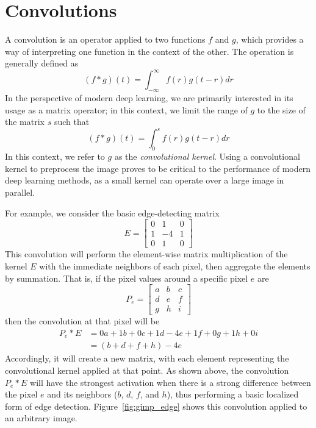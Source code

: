 \section{Convolutions}
A convolution is an operator applied to two functions $f$ and $g$, which provides a way of interpreting one function in the context of the other.
The operation is generally defined as
\[(f * g)(t) = \int_{-\infty}^\infty f(r)g(t-r) dr\]
In the perspective of modern deep learning, we are primarily interested in its usage as a matrix operator; in this context, we limit the range of $g$ to the size of the matrix $s$ such that
\[(f * g)(t) = \int_0^s f(r)g(t-r) dr\]
In this context, we refer to $g$ as the \emph{convolutional kernel}.
Using a convolutional kernel to preprocess the image proves to be critical to the performance of modern deep learning methods, as a small kernel can operate over a large image in parallel.

For example, we consider the basic edge-detecting matrix 
\[E = \begin{bmatrix} 0 & 1 & 0 \\ 1 & -4 & 1 \\ 0 & 1 & 0\end{bmatrix}\]
This convolution will perform the element-wise matrix multiplication of the kernel $E$ with the immediate neighbors of each pixel, then aggregate the elements by summation.
That is, if the pixel values around a specific pixel $e$ are 
\[P_e = \begin{bmatrix} a & b & c \\ d & e & f \\ g & h & i\end{bmatrix}\]
then the convolution at that pixel will be
\begin{align*}
P_e * E &= 0a + 1b + 0c + 1d -4e + 1f + 0g+ 1h + 0i \\
&= (b + d + f + h) - 4e
\end{align*}
Accordingly, it will create a new matrix, with each element representing the convolutional kernel applied at that point.
As shown above, the convolution $P_e * E$ will have the strongest activation when there is a strong difference between the pixel $e$ and its neighbors ($b$, $d$, $f$, and $h$), thus performing a basic localized form of edge detection.
Figure~\ref{fig:gimp_edge} shows this convolution applied to an arbitrary image.


